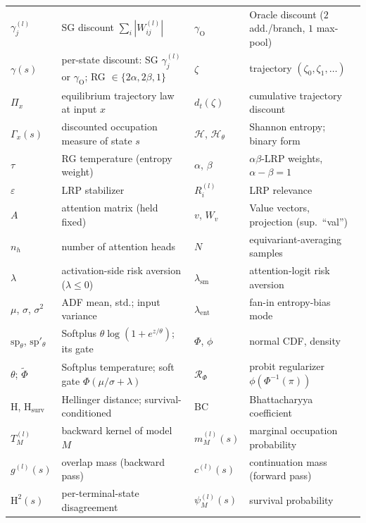 \documentclass[twoside]{article}
\newcommand{\1}{\mathbf{1}}
\begin{document}
\begin{table}[H]
\begin{tabularx}{\textwidth}{@{}l X l X@{}}
        $\gamma^{(l)}_j$ & \ac{SG} discount $\sum_i |W^{(l)}_{ij}|$ & $\gamma_{\mathrm{O}}$ & Oracle
        discount ($2$ add./branch, $1$ max-pool) \\
        $\gamma(s)$ & per-state discount: \ac{SG} $\gamma^{(l)}_j$ or $\gamma_{\mathrm{O}}$; \ac{RG} $\in
            \{2\alpha, 2\beta, 1\}$ & $\zeta$ & trajectory $(\zeta_0, \zeta_1, \dots)$ \\
        $\Pi_x$ & equilibrium trajectory law at input $x$ & $d_t(\zeta)$ & cumulative trajectory discount
        \\
        $\Gamma_x(s)$ & discounted occupation measure of state $s$ & $\mathcal{H}$, $\mathcal{H}_\theta$ &
        Shannon entropy; binary form \\
        \midrule
        $\tau$ & \ac{RG} temperature (entropy weight) & $\alpha$, $\beta$ & $\alpha\beta$-\ac{LRP} weights,
        $\alpha - \beta = 1$ \\
        $\varepsilon$ & \ac{LRP} stabilizer & $R^{(l)}_i$ & \ac{LRP} relevance \\
        $A$ & attention matrix (held fixed) & $v$, $W_v$ & Value vectors, projection (sup.\ ``val'') \\
        $n_h$ & number of attention heads & $N$ & equivariant-averaging samples \\
        \midrule
        $\lambda$ & activation-side risk aversion ($\lambda \le 0$) & $\lambda_{\mathrm{sm}}$ &
        attention-logit risk aversion \\
        $\mu$, $\sigma$, $\sigma^2$ & \ac{ADF} mean, std.; input variance & $\lambda_{\mathrm{ent}}$ &
        fan-in entropy-bias mode \\
        $\mathrm{sp}_\theta$, $\mathrm{sp}'_\theta$ & Softplus $\theta\log(1 {+} e^{z/\theta})$; its gate &
        $\Phi$, $\phi$ & normal \ac{CDF}, density \\
        $\theta$; $\tilde\Phi$ & Softplus temperature; soft gate $\Phi(\mu/\sigma+\lambda)$ &
        $\mathcal{R}_\Phi$ & probit regularizer $\phi(\Phi^{-1}(\pi))$ \\
        \midrule
        $\mathrm{H}$, $\mathrm{H}_{\mathrm{surv}}$ & Hellinger distance; survival-conditioned & BC &
        Bhattacharyya coefficient \\
        $T^{(l)}_M$ & backward kernel of model $M$ & $m^{(l)}_M(s)$ & marginal occupation probability \\
        $g^{(l)}(s)$ & overlap mass (backward pass) & $c^{(l)}(s)$ & continuation mass (forward pass) \\
        $\mathrm{H}^2(s)$ & per-terminal-state disagreement & $\psi^{(l)}_M(s)$ & survival probability \\
        \bottomrule
    \end{tabularx}
\end{table}
\newpage
\end{document}

